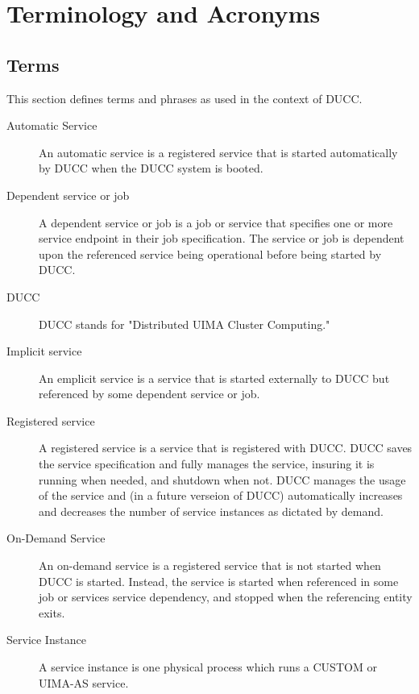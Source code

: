 \ifpdf
\else
{}
\fi
\chapter{Terminology and Acronyms}

\section{Terms }
    This section defines terms and phrases as used in the context of DUCC. 

\begin{description}
\item[Automatic Service ] An automatic service is a registered service that is started automatically
  by DUCC when the DUCC system is booted.

\item[Dependent service or job ] A dependent service or job is a job or service that specifies one
  or more service endpoint in their job specification. The service or job is dependent upon the
  referenced service being operational before being started by DUCC.

\item[DUCC ] DUCC stands for "Distributed UIMA Cluster Computing."

\item[Implicit service ] An emplicit service is a service that is started externally to DUCC but
  referenced by some dependent service or job. 

\item[Registered service ] A registered service is a service that is registered with DUCC. DUCC
  saves the service specification and fully manages the service, insuring it is running when needed,
  and shutdown when not. DUCC manages the usage of the service and (in a future verseion of DUCC)
  automatically increases and decreases the number of service instances as dictated by demand.

\item[On-Demand Service] An on-demand service is a registered service that is not started when DUCC
  is started. Instead, the service is started when referenced in some job or services service
  dependency, and stopped when the referencing entity exits.

\item[Service Instance ] A service instance is one physical process which runs a CUSTOM or UIMA-AS
  service.


\end{description}
